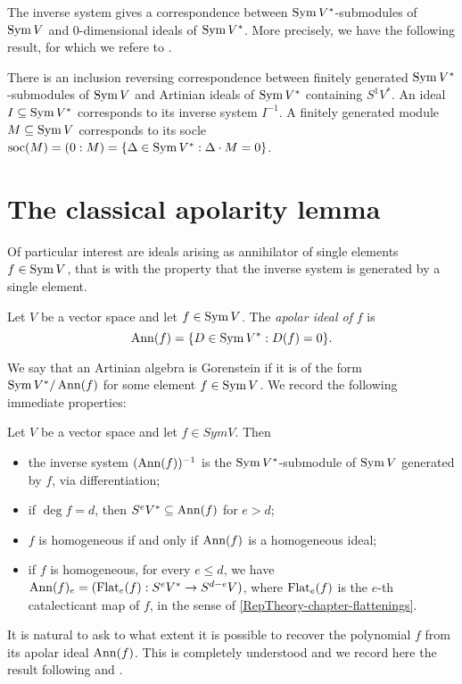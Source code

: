 The inverse system gives a correspondence between $\operatorname{Sym} V^*$-submodules of $\operatorname{Sym} V$ and $0$-dimensional ideals of $\operatorname{Sym} V^*$. More precisely, we have the following result, for which we refere to \cite[Theorem 21.6]{Eis95}.
\begin{theorem}
 \label{apolarity-theorem-MacaulayCorrespondence}
There is an inclusion reversing correspondence between finitely generated $\operatorname{Sym} V^*$-submodules of $\operatorname{Sym} V$ and Artinian ideals of $\operatorname{Sym} V^*$ containing $S^1 V^*$. An ideal $I \subseteq \operatorname{Sym} V^*$ corresponds to its inverse system $I^{-1}$. A finitely generated module $M \subseteq \operatorname{Sym} V$ corresponds to its socle $\operatorname{soc}(M) = (0: M) = \{ \Delta \in \operatorname{Sym} V^*: \Delta \cdot M = 0\}$.
\end{theorem}

\section{The classical apolarity lemma}
\label{tensorRank-section-apolarityLemma}

Of particular interest are ideals arising as annihilator of single elements $f \in \operatorname{Sym} V$, that is with the property that the inverse system is generated by a single element. 
\begin{definition}
\label{tensorRank-definition-apolarIdeal}
Let $V$ be a vector space and let $f \in \operatorname{Sym} V$. The {\it apolar ideal of} $f$ is
\[
\operatorname{Ann}(f) = \{ D \in \operatorname{Sym} V^* : D (f) = 0 \}.
\]
\end{definition}
We say that an Artinian algebra is Gorenstein if it is of the form $\operatorname{Sym} V^* / \operatorname{Ann}(f)$ for some element $f \in \operatorname{Sym} V$.  We record the following immediate properties:
\begin{lemma}
\label{tensorRank-definition-apolarIdealBasics}
Let $V$ be a vector space and let $f \in Sym V$. Then
\begin{itemize}
\item the inverse system $(\operatorname{Ann}(f))^{-1}$ is the $\operatorname{Sym} V^*$-submodule of $\operatorname{Sym} V$ generated by $f$, via differentiation;
 \item if $\deg f = d$, then $S^e V^* \subseteq \operatorname{Ann}(f)$ for $e > d$;
\item $f$ is homogeneous if and only if $\operatorname{Ann}(f)$ is a homogeneous ideal;
\item if $f$ is homogeneous, for every $e \leq d$, we have $\operatorname{Ann}(f)_e = (\mathrm{Flat}_e(f) : S^e V^* \to S^{d-e} V)$, where $\mathrm{Flat}_e(f)$ is the $e$-th catalecticant map of $f$, in the sense of \ref{RepTheory-chapter-flattenings}.
\end{itemize}
\end{lemma}
It is natural to ask to what extent it is possible to recover the polynomial $f$ from its apolar ideal $\operatorname{Ann}(f)$. This is completely understood and we record here the result following \cite[Lemma 3.33A]{IE78} and \cite[Prop. 2.14]{Jel17}.

